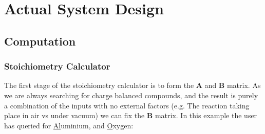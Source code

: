 \section{Actual System Design}
\subsection{Computation}
\subsubsection{Stoichiometry Calculator}
The first stage of the stoichiometry calculator is to form the $\mathbf{A}$ and $\mathbf{B}$ matrix. As we are always searching for charge balanced compounds, and the result is purely a combination of the inputs with no external factors (e.g. The reaction taking place in air vs under vacuum) we can fix the $\mathbf{B}$ matrix. In this example the user has queried for \underline{Al}uminium, and \underline{O}xygen:

